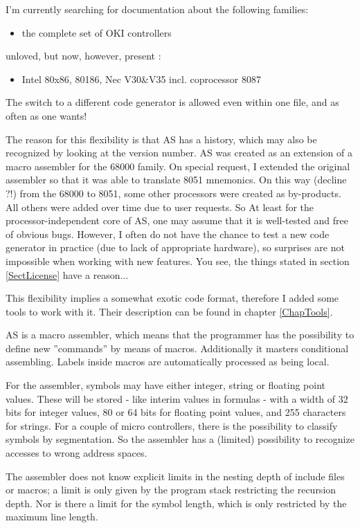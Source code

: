 \documentclass[12pt,twoside]{report}
\begin{document}
I'm currently searching for documentation about the following
families:
\begin{itemize}
\item{the complete set of OKI controllers}
\end{itemize}
unloved, but now, however, present :
\begin{itemize}
\item{Intel 80x86, 80186, Nec V30\&V35 incl. coprocessor 8087}
\end{itemize}
The switch to a different code generator is allowed even within one 
file, and as often as one wants!

The reason for this flexibility is that AS has a history, which may also
be recognized by looking at the version number. AS was created as an
extension of a macro assembler for the 68000 family. On special request, I
extended the original assembler so that it was able to translate 8051
mnemonics.  On this way (decline ?!) from the 68000 to 8051, some other
processors were created as by-products.  All others were added over time
due to user requests.  So At least for the processor-independent core of
AS, one may assume that it is well-tested and free of obvious bugs. 
However, I often do not have the chance to test a new code generator in
practice (due to lack of appropriate hardware), so surprises are not
impossible when working with new features.  You see, the things stated in
section \ref{SectLicense} have a reason...

This flexibility implies a somewhat exotic code format, therefore I
added some tools to work with it. Their description can be found in
chapter \ref{ChapTools}.

AS is a macro assembler, which means that the programmer has the
possibility to define new ''commands'' by means of macros. 
Additionally it masters conditional assembling.  Labels inside macros
are automatically processed as being local.

For the assembler, symbols may have either integer, string or floating
point values.  These will be stored - like interim values in formulas -
with a width of 32 bits for integer values, 80 or 64 bits for floating
point values, and 255 characters for strings.  For a couple of micro
controllers, there is the possibility to classify symbols by segmentation.
So the assembler has a (limited) possibility to recognize accesses to
wrong address spaces.

The assembler does not know explicit limits in the nesting depth of 
include files or macros; a limit is only given by the program stack 
restricting the recursion depth.  Nor is there a limit for the 
symbol length, which is only restricted by the maximum line length. 
\end{document}

